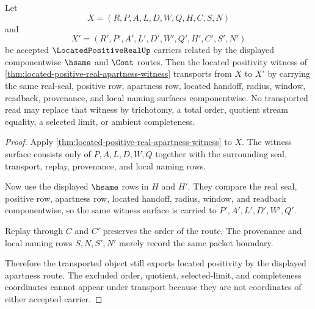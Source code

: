 \begin{theorem}
\label{thm:located-positive-real-transport-stability}
Let
$$
X=(R,P,A,L,D,W,Q,H,C,S,N)
$$
and
$$
X'=(R',P',A',L',D',W',Q',H',C',S',N')
$$
be accepted $\LocatedPositiveRealUp$ carriers related by the displayed componentwise $\hsame$ and $\Cont$ routes. Then the located positivity witness of \autoref{thm:located-positive-real-apartness-witness} transports from $X$ to $X'$ by carrying the same real-seal, positive row, apartness row, located handoff, radius, window, readback, provenance, and local naming surfaces componentwise. No transported read may replace that witness by trichotomy, a total order, quotient stream equality, a selected limit, or ambient completeness.
\end{theorem}
\begin{proof}
Apply \autoref{thm:located-positive-real-apartness-witness} to $X$. The witness surface consists only of $P,A,L,D,W,Q$ together with the surrounding seal, transport, replay, provenance, and local naming rows.

Now use the displayed $\hsame$ rows in $H$ and $H'$. They compare the real seal, positive row, apartness row, located handoff, radius, window, and readback componentwise, so the same witness surface is carried to $P',A',L',D',W',Q'$.

Replay through $C$ and $C'$ preserves the order of the route. The provenance and local naming rows $S,N,S',N'$ merely record the same packet boundary.

Therefore the transported object still exports located positivity by the displayed apartness route. The excluded order, quotient, selected-limit, and completeness coordinates cannot appear under transport because they are not coordinates of either accepted carrier.
\end{proof}

